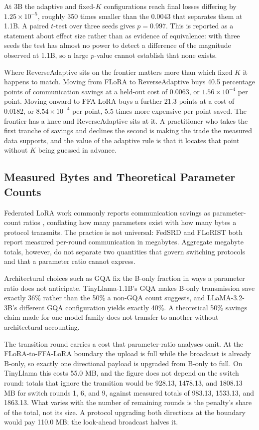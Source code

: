 \documentclass[iicol,pdflatex,sn-mathphys-num]{sn-jnl}
\begin{document}
At 3B the adaptive and fixed-$K$ configurations reach final losses differing by $1.25 \times 10^{-5}$, roughly 350 times smaller than the 0.0043 that separates them at 1.1B. A paired $t$-test over three seeds gives $p = 0.997$. This is reported as a statement about effect size rather than as evidence of equivalence: with three seeds the test has almost no power to detect a difference of the magnitude observed at 1.1B, so a large $p$-value cannot establish that none exists.

Where ReverseAdaptive sits on the frontier matters more than which fixed $K$ it happens to match. Moving from FLoRA to ReverseAdaptive buys 40.5 percentage points of communication savings at a held-out cost of 0.0063, or $1.56 \times 10^{-4}$ per point. Moving onward to FFA-LoRA buys a further 21.3 points at a cost of 0.0182, or $8.54 \times 10^{-4}$ per point, 5.5 times more expensive per point saved. The frontier has a knee and ReverseAdaptive sits at it. A practitioner who takes the first tranche of savings and declines the second is making the trade the measured data supports, and the value of the adaptive rule is that it locates that point without $K$ being guessed in advance.

\subsection{Measured Bytes and Theoretical Parameter Counts}
\label{sec:measuredbytes}
Federated LoRA work commonly reports communication savings as parameter-count ratios \cite{zhang2024federatedgpt,sun2024ffalora,wang2024flora,bai2024flexlora}, conflating how many parameters exist with how many bytes a protocol transmits. The practice is not universal: FedSRD \cite{yan2026fedsrd} and FLoRIST \cite{ramesh2026florist} both report measured per-round communication in megabytes. Aggregate megabyte totals, however, do not separate two quantities that govern switching protocols and that a parameter ratio cannot express.

Architectural choices such as GQA fix the B-only fraction in ways a parameter ratio does not anticipate. TinyLlama-1.1B's GQA makes B-only transmission save exactly 36\% rather than the 50\% a non-GQA count suggests, and LLaMA-3.2-3B's different GQA configuration yields exactly 40\%. A theoretical 50\% savings claim made for one model family does not transfer to another without architectural accounting.

The transition round carries a cost that parameter-ratio analyses omit. At the FLoRA-to-FFA-LoRA boundary the upload is full while the broadcast is already B-only, so exactly one directional payload is upgraded from B-only to full. On TinyLlama this costs 55.0 MB, and the figure does not depend on the switch round: totals that ignore the transition would be 928.13, 1478.13, and 1808.13 MB for switch rounds 1, 6, and 9, against measured totals of 983.13, 1533.13, and 1863.13. What varies with the number of remaining rounds is the penalty's share of the total, not its size. A protocol upgrading both directions at the boundary would pay 110.0 MB; the look-ahead broadcast halves it.
\end{document}
